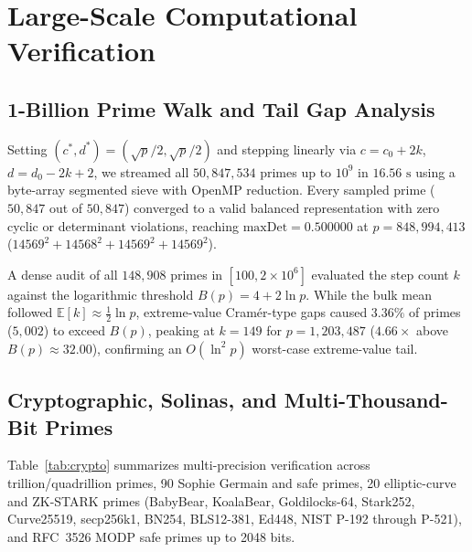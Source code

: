 \documentclass[conference]{IEEEtran}
\begin{document}
\section{Large-Scale Computational Verification}

\subsection{1-Billion Prime Walk and Tail Gap Analysis}
Setting $(c^*, d^*) = (\sqrt{p}/2, \sqrt{p}/2)$ and stepping linearly via $c = c_0 + 2k$, $d = d_0 - 2k + 2$, we streamed all $50,847,534$ primes up to $10^9$ in $16.56\text{ s}$ using a byte-array segmented sieve with OpenMP reduction. Every sampled prime ($50,847$ out of $50,847$) converged to a valid balanced representation with zero cyclic or determinant violations, reaching $\mathrm{maxDet} = 0.500000$ at $p = 848,994,413$ ($14569^2 + 14568^2 + 14569^2 + 14569^2$).

A dense audit of all $148,908$ primes in $[100, 2\times 10^6]$ evaluated the step count $k$ against the logarithmic threshold $B(p) = 4 + 2\ln p$. While the bulk mean followed $\mathbb{E}[k] \approx \frac{1}{2}\ln p$, extreme-value Cram\'er-type gaps caused $3.36\%$ of primes ($5,002$) to exceed $B(p)$, peaking at $k = 149$ for $p = 1,203,487$ ($4.66\times$ above $B(p) \approx 32.00$), confirming an $O(\ln^2 p)$ worst-case extreme-value tail.

\subsection{Cryptographic, Solinas, and Multi-Thousand-Bit Primes}
Table~\ref{tab:crypto} summarizes multi-precision verification across trillion/quadrillion primes, 90 Sophie Germain and safe primes, 20 elliptic-curve and ZK-STARK primes (BabyBear, KoalaBear, Goldilocks-64, Stark252, Curve25519, secp256k1, BN254, BLS12-381, Ed448, NIST P-192 through P-521), and RFC~3526 MODP safe primes up to 2048 bits.
\end{document}

